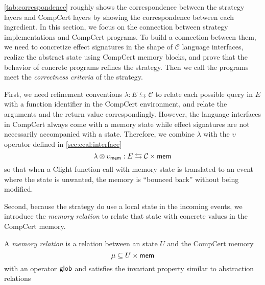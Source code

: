 \documentclass[acmsmall,review,anonymous]{acmart}\settopmatter{printfolios=true,printccs=false,printacmref=false}
\begin{document}
\autoref{tab:correspondence} roughly shows
the correspondence
between the strategy layers and CompCert layers
by showing the correspondence
between each ingredient.
In this section, we focus on
the connection between
strategy implementations and CompCert programs.
To build a connection between them,
we need to concretize effect signatures
in the shape of $\mathcal{C}$ language interfaces,
realize the abstract state
using CompCert memory blocks,
and prove that the behavior of concrete programs
refines the strategy.
Then we call the programs meet
the \emph{correctness criteria} of the strategy.

First, we need refinement conventions
$\lambda : E \leftrightarrows \mathcal{C}$
to relate each possible query in $E$
with a function identifier
in the CompCert environment,
and relate the arguments
and the return value correspondingly.
However, the language interfaces in CompCert
always come with a memory state
while effect signatures
are not necessarily accompanied
with a state.
Therefore,
we combine $\lambda$ with the $\upsilon$ operator
defined in \ref{sec:ccal:interface}
\[
  \lambda \otimes \upsilon_{ \mathsf{mem} } : E \leftrightarrows \mathcal{C}\times \mathsf{mem} 
\]
so that
when a Clight function call with memory state
is translated to an event
where the state is unwanted,
the memory is ``bounced back'' without being modified.

Second,
because the strategy do use a local state
in the incoming events,
we introduce the \emph{memory relation}
to relate that state
with concrete values in the CompCert memory.

\begin{definition}
  A \emph{memory relation} is a relation
  between an state $U$ and the CompCert memory
  \[
    \mu \subseteq U \times  \mathsf{mem} 
  \]
  with an operator $ \mathsf{glob} $
  and satisfies the invariant property
  similar to abstraction relations
\end{definition}
\end{document}
